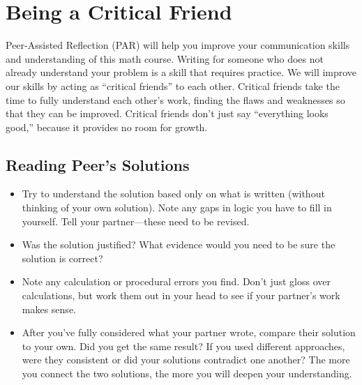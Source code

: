 \documentclass[letter]{article}
\begin{document}
	\section*{Being a Critical Friend}

	Peer-Assisted Reflection (PAR) will help you improve your communication skills and understanding 
	of this math course. 
	Writing for someone who does not already understand your problem is a skill that requires
	practice. We will improve our skills by acting as ``critical friends'' to each other. 
	Critical friends take the time to fully understand each other's work, 
	finding the flaws and weaknesses so that they can be improved.
	Critical friends don't just say ``everything looks good,'' because it provides no room for growth.

	\subsection*{Reading Peer's Solutions}
	\begin{itemize}
		\item Try to understand the solution based only on what is
		written (without thinking of your own solution).  Note any
		gaps in logic you have to fill in yourself. Tell your
		partner---these need to be revised.  
		
		\item Was the solution
		justified? What evidence would you need to be sure the
		solution is correct?  
	
		\item Note any calculation or
		procedural errors you find. Don't just gloss over
		calculations, but work them out in your head to see
		if your partner's work makes sense.  
	
		\item After you've fully considered what your partner wrote,
		compare their solution to your own. Did you
		get the same result? If you used different approaches,
		were they consistent or did your solutions contradict
		one another? The more you connect the two solutions, the
		more you will deepen your understanding.
	\end{itemize}
\end{document}
